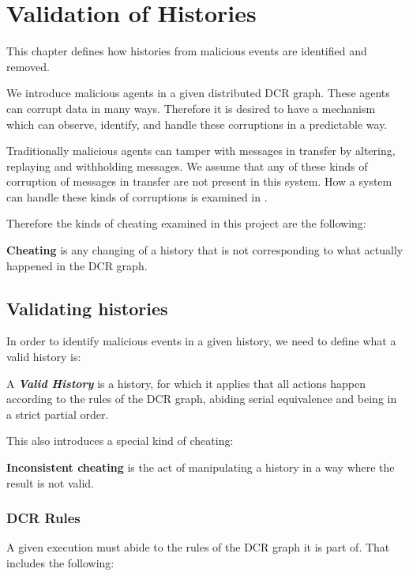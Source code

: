 \chapter{Validation of Histories}
\label{chap:consensusindcr}
	This chapter defines how histories from malicious events are identified and removed.
	
	\newpar We introduce malicious agents in a given distributed DCR graph. These agents can corrupt data in many ways. Therefore it is desired to have a mechanism which can observe, identify, and handle these corruptions in a predictable way. 
	
	Traditionally malicious agents can tamper with messages in transfer by altering, replaying and withholding messages. We assume that any of these kinds of corruption of messages in transfer are not present in this system. How a system can handle these kinds of corruptions is examined in .
	
	\newpar Therefore the kinds of cheating examined in this project are the following:
	\begin{definition}
		\textbf{Cheating} is any changing of a history that is not corresponding to what actually happened in the DCR graph.
	\end{definition}
	
	\section{Validating histories}
	In order to identify malicious events in a given history, we need to define what a valid history is:
	
		\begin{definition}
			A \textit{\textbf{Valid History}} is a history, for which it applies that all actions happen according to the rules of the DCR graph, abiding serial equivalence and being in a strict partial order. 
		\end{definition}
		
	This also introduces a special kind of cheating:
	
		\begin{definition}
			\textbf{Inconsistent cheating} is the act of manipulating a history in a way where the result is not valid.
		\end{definition}
		
	\subsection{DCR Rules}
	A given execution must abide to the rules of the DCR graph it is part of. That includes the following:
	
